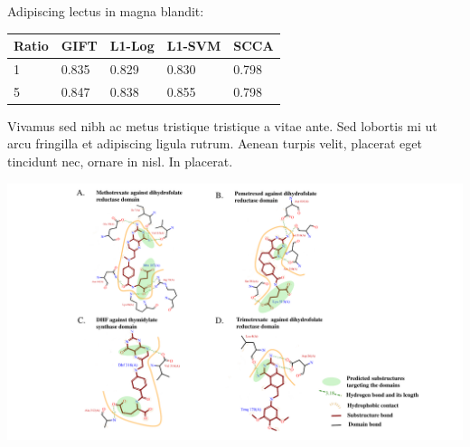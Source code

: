 \documentclass[a0,portrait]{a0poster}
\begin{document}
\begin{multicols}{2}
Adipiscing lectus in magna blandit:
\begin{center}\vspace{1cm} %
\begin{tabular}{l l l l l}
\toprule
\textbf{Ratio} & \textbf{GIFT} & \textbf{L1-Log} & \textbf{L1-SVM} & \textbf{SCCA}\\
\midrule
1 & 0.835 & 0.829 & 0.830 & 0.798 \\
5 & 0.847 & 0.838 & 0.855 & 0.798 \\
\bottomrule
\end{tabular}
\end{center}\vspace{1cm}


Vivamus sed nibh ac metus tristique tristique a vitae ante. Sed lobortis mi ut arcu fringilla et adipiscing ligula rutrum. Aenean turpis velit, placerat eget tincidunt nec, ornare in nisl. In placerat.

\begin{center}\vspace{1cm}
  \includegraphics[width=0.9\linewidth]{ligplot_5}
\end{center}\vspace{1cm}


\end{multicols}
\end{document}
